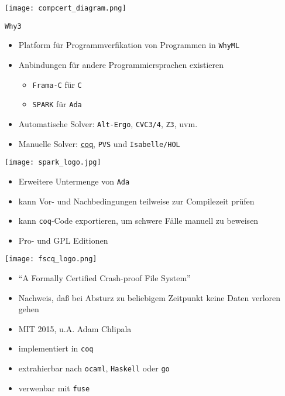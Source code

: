 \documentclass[aspectratio=169]{beamer}
\begin{document}
\begin{frame}
  \begin{center}
    \texttt{[image: compcert\_diagram.png]}
  \end{center}
\end{frame}
\begin{frame}
  \begin{center}
    \Large{\texttt{Why3}}
  \end{center}
  \begin{itemize}
  \item Platform für Programmverfikation von Programmen in \texttt{WhyML}
  \item Anbindungen für andere Programmiersprachen existieren
    \begin{itemize}
    \item \texttt{Frama-C} für \texttt{C}
    \item \texttt{SPARK} für \texttt{Ada}
    \end{itemize}
  \item Automatische Solver: \texttt{Alt-Ergo}, \texttt{CVC3/4}, \texttt{Z3}, uvm. 
  \item Manuelle Solver: \underline{\texttt{coq}}, \texttt{PVS} und \texttt{Isabelle/HOL}
  \end{itemize}
\end{frame}
\begin{frame}
  \begin{center}
    \texttt{[image: spark\_logo.jpg]}    
  \end{center}
  \begin{itemize}
  \item Erweitere Untermenge von \texttt{Ada}
  \item kann Vor- und Nachbedingungen teilweise zur Compilezeit prüfen
  \item kann \texttt{coq}-Code exportieren, um schwere Fälle manuell zu beweisen
  \item Pro- und GPL Editionen
  \end{itemize}
\end{frame}
\begin{frame}
  \begin{center}
    \texttt{[image: fscq\_logo.png]}
  \end{center}
  \begin{itemize}
  \item ``A Formally Certified Crash-proof File System''
  \item Nachweis, daß bei Absturz zu beliebigem Zeitpunkt keine Daten verloren gehen
  \item MIT 2015, u.A. Adam Chlipala
  \item implementiert in \texttt{coq}
  \item extrahierbar nach \texttt{ocaml}, \texttt{Haskell} oder \texttt{go}
  \item verwenbar mit \texttt{fuse} 
  \end{itemize}
\end{frame}
\end{document}
